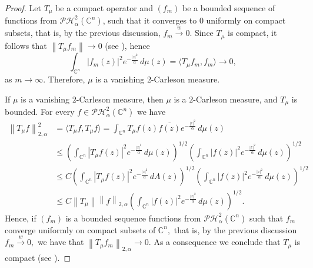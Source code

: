 \documentclass[10pt,leqno]{amsart}
\theoremstyle{remark}
\numberwithin{equation}{section}
\newcommand{\hph}{\mathcal{PH}_\alpha^2(\mathbb{C}^n)}%
\newcommand{\wto}{\stackrel{w}{\to}}%
\begin{document}
\begin{proof}
	Let $T_\mu$ be a compact operator and $\left( f_m \right) $ be a bounded sequence of functions from $\hph$, such that it converges to 0 uniformly on compact subsets, that is, by the previous discussion, $f_m \wto 0$. Since $T_\mu$ is compact, it follows that $\left\lVert T_\mu f_m \right\rVert \to 0$ (see \cite[Thm 1.14]{zhuOperatorTheoryFunction2007}), hence
	\[
		\int_{\mathbb{C}^{n}}^{}\left| f_m(z) \right| ^2e^{-\frac{|z|^2}{\alpha}}\, d\mu(z) = \langle T_\mu f_m,f_m \rangle  \to 0,
	\]
	as $m \to \infty.$ Therefore, $\mu$ is a vanishing $2$-Carleson measure.


	If $\mu$ is a vanishing $2$-Carleson measure, then $\mu$ is a $2$-Carleson measure, and $T_\mu$ is bounded. For every $f \in \hph$ we have
	\begin{align*}
		\left\lVert T_\mu f \right\rVert_{2,\alpha}^2
		 & = \langle T_\mu f,T_\mu f \rangle = \int_{\mathbb{C}^{n}}^{}T_\mu f(z) \overline{f(z)} e^{-\frac{|z|^2}{\alpha}}\, d\mu(z)                                                                                                  \\
		 & \leq\left( \int_{\mathbb{C}^{n}}^{}\left| T_\mu f(z) \right|^2e^{-\frac{|z|^2}{\alpha}} \, d\mu(z) \right) ^{1/2} \left( \int_{\mathbb{C}^{n}}^{}\left| f(z) \right| ^2 e^{-\frac{|z|^2}{\alpha}}\, d\mu(z) \right) ^{1/2}  \\
		 & \leq C \left( \int_{\mathbb{C}^{n}}^{}\left| T_\mu f(z) \right|^2e^{-\frac{|z|^2}{\alpha}} \, dA(z) \right) ^{1/2} \left( \int_{\mathbb{C}^{n}}^{}\left| f(z) \right| ^2 e^{-\frac{|z|^2}{\alpha}}\, d\mu(z) \right) ^{1/2} \\
		 & \leq  C \left\lVert T_\mu \right\rVert \left\lVert f \right\rVert _{2,\alpha} \left( \int_{\mathbb{C}^{n}}^{}\left| f (z)\right| ^{2}e^{-\frac{|z|^2}{\alpha}}\, d\mu(z)  \right)^{1/2}.
	\end{align*}
	Hence, if $(f_m)$ is a bounded sequence functions from $\hph$ such that $f_m$ converge uniformly on compact subsets of $\mathbb{C}^{n},$ that is, by the previous discussion $f_m \wto 0,$ we have that $\left\lVert T_\mu f_m \right\rVert_{2,\alpha} \to 0.$ As a consequence we conclude that $T_\mu$ is compact (see \cite[Thm 1.14]{zhuOperatorTheoryFunction2007}).
\end{proof}
\end{document}
